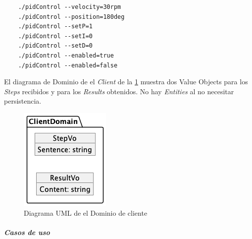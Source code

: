 \begin{verbatim}
    ./pidControl --velocity=30rpm
    ./pidControl --position=180deg
    ./pidControl --setP=1
    ./pidControl --setI=0
    ./pidControl --setD=0
    ./pidControl --enabled=true
    ./pidControl --enabled=false
\end{verbatim}

El diagrama de Dominio de el \textit{Client} de la \cref{fig:Diagrama UML de el Dominio de cliente} muestra dos Value Objects para los \textit{Steps} recibidos y para los \textit{Results} obtenidos.
No hay \textit{Entities} al no necesitar persistencia.

\begin{figure}[H]
    \centering
    \includegraphics[height=0.2\textheight]{./part/Proyecto_ejecutivo/memoria_descriptiva/descripcionDelProyecto/client/uml/clientDomain}
    \caption{Diagrama UML de el Dominio de cliente}\label{fig:Diagrama UML de el Dominio de cliente}
\end{figure}

\subparagraph{Casos de uso}

